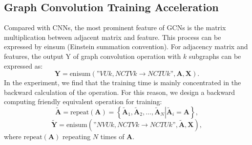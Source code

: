 \documentclass[10pt,twocolumn,letterpaper]{article}
\begin{document}
\subsection{Graph Convolution Training Acceleration}
Compared with CNNs, the most prominent feature of GCNs is the matrix multiplication between adjacent matrix and feature. This process can be expressed by einsum (Einstein summation convention). For adjacency matrix and features, the output Y of graph convolution operation with $k$ subgraphs can be expressed as:
\begin{equation}
    \mathbf{Y}=\text{enisum}\left( \text{''}VUk,NCTVk\to NCTUk\text{''},\mathbf{A},\mathbf{X} \right).
\end{equation}
In the experiment, we find that the training time is mainly concentrated in the backward calculation of the operation. For this reason, we design a backward computing friendly equivalent operation for training:
\begin{equation}
    \mathbf{\tilde{A}}=\text{repeat}\left( \mathbf{A} \right)=\left\{ {{{\mathbf{\tilde{A}}}}_{1}},{{{\mathbf{\tilde{A}}}}_{2}},\ldots ,{{{\mathbf{\tilde{A}}}}_{N}}\left| {{{\mathbf{\tilde{A}}}}_{i}}=\mathbf{A} \right. \right\},
\end{equation}
\begin{equation}
    \mathbf{\tilde{Y}}=\text{enisum}\left( \text{''}NVUk,NCTVk\to NCTUk\text{''},\mathbf{\tilde{A}},\mathbf{X} \right),
\end{equation}
where $\text{repeat}\left( \mathbf{A}\right)$ repeating $N$ times of $\mathbf{A}$. 
\end{document}
